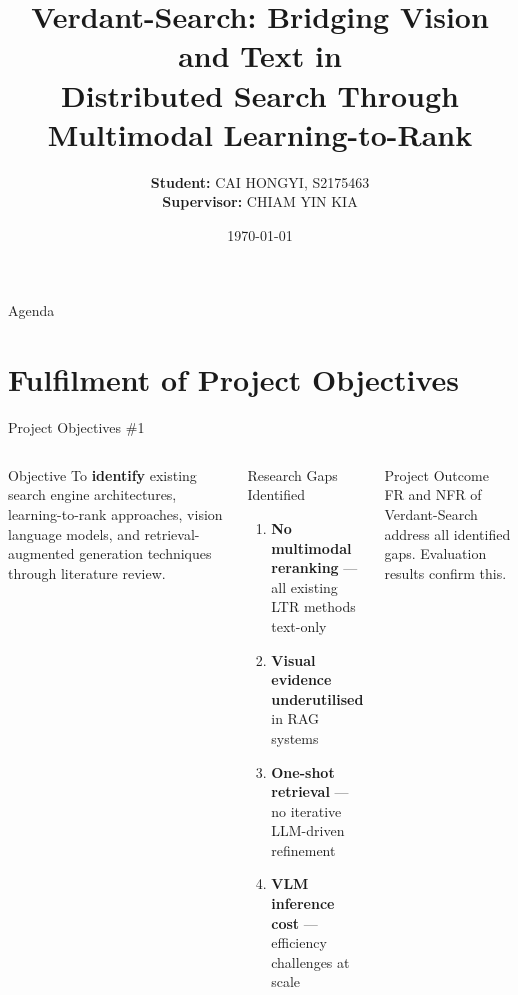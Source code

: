 \documentclass[aspectratio=169,xcolor=dvipsnames]{beamer}
\title{Verdant-Search: Bridging Vision and Text in\\
       Distributed Search Through Multimodal Learning-to-Rank}
\author{%
  \textbf{Student:} CAI HONGYI, S2175463 \\[0.3em]
  \textbf{Supervisor:} CHIAM YIN KIA
}
\institute{Software Engineering Department, Universiti Malaya}
\date{\today}
\begin{document}
\begin{frame}
  \titlepage
\end{frame}

\begin{frame}{Agenda}
  \tableofcontents
\end{frame}

\section{Fulfilment of Project Objectives}

\begin{frame}{Project Objectives \#1}
  \begin{columns}[t]
    \begin{block}{Objective}
      To \textbf{identify} existing search engine architectures,
      learning-to-rank approaches, vision language models, and
      retrieval-augmented generation techniques through literature review.
    \end{block}
    \begin{alertblock}{Research Gaps Identified}
      \begin{enumerate}\small
        \item \textbf{No multimodal reranking} — all existing LTR methods text-only
        \item \textbf{Visual evidence underutilised} in RAG systems
        \item \textbf{One-shot retrieval} — no iterative LLM-driven refinement
        \item \textbf{VLM inference cost} — efficiency challenges at scale
      \end{enumerate}
    \end{alertblock}
    \vspace{.4em}
    \begin{exampleblock}{Project Outcome}
      \small FR and NFR of Verdant-Search address all identified gaps.
      Evaluation results confirm this.
    \end{exampleblock}
  \end{columns}
\end{frame}
\end{document}
